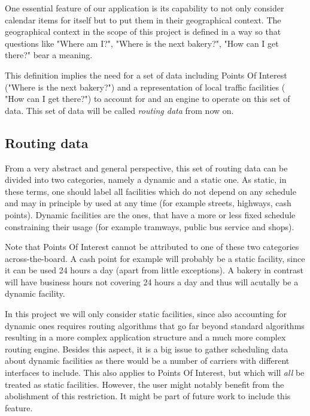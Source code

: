 One essential feature of our application is its capability to not only consider calendar items for itself but to put them in their geographical context. The geographical context in the scope of this project is defined in a way so that questions like "Where am I?", "Where is the next bakery?", "How can I get there?" bear a meaning.\newline

This definition implies the need for a set of data including Points Of Interest ("Where is the next bakery?") and a representation of  local traffic facilities ( "How can I get there?") to account for and an engine to operate on this set of data. This set of data will be called \emph{routing data} from now on.\newline

\subsection{Routing data}

From a very abstract and general perspective, this set of routing data can be divided into two categories, namely a dynamic and a static one. As static, in these terms, one should label all facilities which do not depend on any schedule and may in principle by used at any time (for example streets, highways, cash points). Dynamic facilities are the ones, that have a more or less fixed schedule constraining their usage (for example tramways, public bus service and shops).\newline

Note that Points Of Interest cannot be attributed to one of these two categories across-the-board. A cash point for example will probably be a static facility, since it can be used 24 hours a day (apart from little exceptions). A bakery in contrast will have business hours not covering 24 hours a day and thus will acutally be a dynamic facility.\newline

In this project we will only consider static facilities, since also accounting for dynamic ones requires routing algorithms that go far beyond standard algorithms resulting in a more complex application structure and a much more complex routing engine. Besides this aspect, it is a big issue to gather scheduling data about dynamic facilities as there would be a number of carriers with different interfaces to include. This also applies to Points Of Interest, but which will \emph{all} be treated as static facilities. However, the user might notably benefit from the abolishment of this restriction. It might be part of future work to include this feature.\newline

